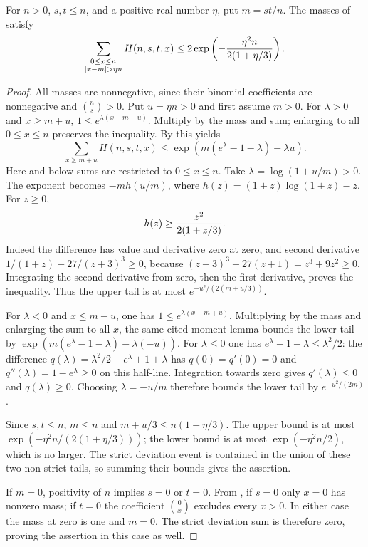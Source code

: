 \begin{lemma}
For $n>0$, $s,t\le n$, and a positive real number $\eta$, put $m=st/n$.
The masses of  satisfy
\[
 \sum_{\substack{0\le x\le n\\|x-m|>\eta n}} H(n,s,t,x)
 \le2\exp\left(-{\eta^2n\over2(1+\eta/3)}\right).
\]
\end{lemma}
\begin{proof}
All masses are nonnegative, since their binomial coefficients are
nonnegative and $\binom n s>0$. Put $u=\eta n>0$ and first assume $m>0$.
For $\lambda>0$ and $x\ge m+u$,
$1\le e^{\lambda(x-m-u)}$. Multiply by the mass and sum; enlarging to all
$0\le x\le n$ preserves the inequality. By
 this yields
\[
 \sum_{x\ge m+u}H(n,s,t,x)
 \le \exp(m(e^\lambda-1-\lambda)-\lambda u).
\]
Here and below sums are restricted to $0\le x\le n$.
Take $\lambda=\log(1+u/m)>0$. The exponent becomes $-mh(u/m)$, where
$h(z)=(1+z)\log(1+z)-z$. For $z\ge0$,
\[
 h(z)\ge {z^2\over2(1+z/3)}.
\]
Indeed the difference has value and derivative zero at zero, and second
derivative $1/(1+z)-27/(z+3)^3\ge0$, because
$(z+3)^3-27(z+1)=z^3+9z^2\ge0$. Integrating the second derivative from
zero, then the first derivative, proves the inequality. Thus the upper
tail is at most $e^{-u^2/(2(m+u/3))}$.

For $\lambda<0$ and $x\le m-u$, one has
$1\le e^{\lambda(x-m+u)}$. Multiplying by the mass and enlarging the
sum to all $x$, the same cited moment lemma bounds the
lower tail by $\exp(m(e^\lambda-1-\lambda)-\lambda(-u))$.
For $\lambda\le0$ one has $e^\lambda-1-\lambda\le\lambda^2/2$:
the difference $q(\lambda)=\lambda^2/2-e^\lambda+1+\lambda$ has
$q(0)=q'(0)=0$ and $q''(\lambda)=1-e^\lambda\ge0$ on this half-line.
Integration towards zero gives $q'(\lambda)\le0$ and $q(\lambda)\ge0$.
Choosing $\lambda=-u/m$ therefore bounds the lower tail by
$e^{-u^2/(2m)}$.

Since $s,t\le n$, $m\le n$ and $m+u/3\le n(1+\eta/3)$.
The upper bound is at most $\exp(-\eta^2n/(2(1+\eta/3)))$;
the lower bound is at most $\exp(-\eta^2n/2)$, which is no larger.
The strict deviation event is contained in the union of these two
non-strict tails, so summing their bounds gives the assertion.

If $m=0$, positivity of $n$ implies $s=0$ or $t=0$.
From , if $s=0$ only $x=0$ has nonzero mass;
if $t=0$ the coefficient $\binom0x$ excludes every $x>0$.
In either case the mass at zero is one and $m=0$. The strict deviation
sum is therefore zero, proving the assertion in this case as well.
\end{proof}
